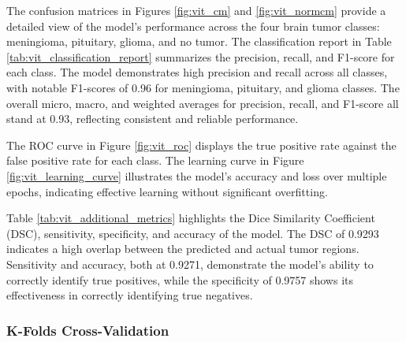 The confusion matrices in Figures \ref{fig:vit_cm} and \ref{fig:vit_normcm} provide a detailed view of the model's performance across the four brain tumor classes: meningioma, pituitary, glioma, and no tumor. The classification report in Table \ref{tab:vit_classification_report} summarizes the precision, recall, and F1-score for each class. The model demonstrates high precision and recall across all classes, with notable F1-scores of 0.96 for meningioma, pituitary, and glioma classes. The overall micro, macro, and weighted averages for precision, recall, and F1-score all stand at 0.93, reflecting consistent and reliable performance.

The ROC curve in Figure \ref{fig:vit_roc} displays the true positive rate against the false positive rate for each class. The learning curve in Figure \ref{fig:vit_learning_curve} illustrates the model's accuracy and loss over multiple epochs, indicating effective learning without significant overfitting.

Table \ref{tab:vit_additional_metrics} highlights the Dice Similarity Coefficient (DSC), sensitivity, specificity, and accuracy of the model. The DSC of 0.9293 indicates a high overlap between the predicted and actual tumor regions. Sensitivity and accuracy, both at 0.9271, demonstrate the model's ability to correctly identify true positives, while the specificity of 0.9757 shows its effectiveness in correctly identifying true negatives.

\subsubsection{K-Folds Cross-Validation}

